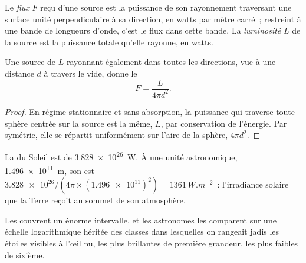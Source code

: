 \begin{definition}\label{def:b1:observing-the-sky:flux}
Le \emph{flux} $F$ reçu d'une source est la
puissance de son rayonnement traversant une surface unité perpendiculaire à sa
direction, en watts par mètre carré~; restreint à une bande de longueurs d'onde,
c'est le flux dans cette bande. La \emph{luminosité} $L$ de
la source est la puissance totale qu'elle rayonne, en watts.
\end{definition}

\begin{proposition}\label{prop:b1:observing-the-sky:inverse-square}
Une source de  $L$ rayonnant également dans toutes les directions,
vue à une distance $d$ à travers le vide, donne le 
\[
  F = \frac{L}{4\pi d^2} .
\]
\end{proposition}

\begin{proof}
En régime stationnaire et sans absorption, la puissance qui traverse toute
sphère centrée sur la source est la même, $L$, par conservation de l'énergie.
Par symétrie, elle se répartit uniformément sur l'aire de la sphère, $4\pi d^2$.
\end{proof}

\begin{example}
La  du Soleil est de \qty{3.828e26}{W}. À une unité astronomique,
\qty{1.496e11}{m}, son  est $\num{3.828e26}/(4\pi\times
(\num{1.496e11})^2) = \qty{1361}{W.m^{-2}}$~: l'irradiance solaire que la
Terre reçoit au sommet de son atmosphère.
\end{example}

Les  couvrent un énorme intervalle, et les astronomes les comparent sur une
échelle logarithmique héritée des classes dans lesquelles on rangeait jadis les
étoiles visibles à l'œil nu, les plus brillantes de première grandeur, les plus
faibles de sixième.


